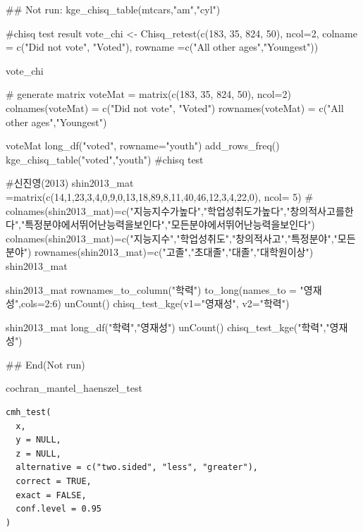 \documentclass[a4paper]{book}
\begin{document}
\begin{Examples}
\begin{ExampleCode}

## Not run: 
kge_chisq_table(mtcars,"am","cyl")


#chisq test result
vote_chi <- Chisq_retest(c(183, 35, 824, 50), ncol=2,
                        colname = c("Did not vote", "Voted"),
                         rowname =c("All other ages","Youngest"))

vote_chi


# generate matrix
voteMat = matrix(c(183, 35, 824, 50), ncol=2)
colnames(voteMat) = c("Did not vote", "Voted")
rownames(voteMat) = c("All other ages","Youngest")

voteMat%
  long_df("voted", rowname="youth")%
  add_rows_freq() %
  kge_chisq_table("voted","youth")    #chisq test


#신진영(2013)
shin2013_mat =matrix(c(14,1,23,3,4,0,9,0,13,18,89,8,11,40,46,12,3,4,22,0), ncol= 5)
# colnames(shin2013_mat)=c("지능지수가높다","학업성취도가높다","창의적사고를한다","특정분야에서뛰어난능력을보인다","모든분야에서뛰어난능력을보인다")
colnames(shin2013_mat)=c("지능지수","학업성취도","창의적사고","특정분야","모든분야")
rownames(shin2013_mat)=c("고졸","초대졸","대졸","대학원이상")
shin2013_mat

shin2013_mat %
  rownames_to_column("학력") %
  to_long(names_to = "영재성",cols=2:6) %
  unCount() %
  chisq_test_kge(v1="영재성", v2="학력")


shin2013_mat%
  long_df("학력","영재성") %
  unCount() %
  chisq_test_kge("학력","영재성")


## End(Not run)
\end{ExampleCode}
\end{Examples}
%
\begin{Description}
cochran\_mantel\_haenszel\_test
\end{Description}
%
\begin{Usage}
\begin{verbatim}
cmh_test(
  x,
  y = NULL,
  z = NULL,
  alternative = c("two.sided", "less", "greater"),
  correct = TRUE,
  exact = FALSE,
  conf.level = 0.95
)
\end{verbatim}
\end{Usage}
%
\end{document}
